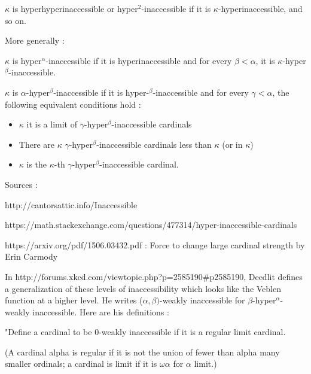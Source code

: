 \documentclass[10pt]{article}
\begin{document}
\(\kappa\) is hyperhyperinaccessible or hyper\(^2\)-inaccessible if it is \(\kappa\)-hyperinaccessible, and so on.

More generally :

\(\kappa\) is hyper\(^\alpha\)-inaccessible if it is hyperinaccessible and for every \( \beta < \alpha \), it is \(\kappa\)-hyper\(^\beta\)-inaccessible.

\(\kappa\) is \(\alpha\)-hyper\(^\beta\)-inaccessible if it is hyper-\(^\beta\)-inaccessible and for every \( \gamma < \alpha \), the following equivalent conditions hold :

\begin{itemize}
     \setlength{\itemsep}{1pt}
     \setlength{\parskip}{0pt}
     \setlength{\parsep}{0pt}

\item \(\kappa\)  it is a limit of \(\gamma\)-hyper\(^\beta\)-inaccessible cardinals

\item There are \(\kappa\) \(\gamma\)-hyper\(^\beta\)-inaccessible cardinals less than \(\kappa\) (or in \(\kappa\))

\item \(\kappa\) is the \(\kappa\)-th \(\gamma\)-hyper\(^\beta\)-inaccessible cardinal.

\end{itemize}

Sources : 

http://cantorsattic.info/Inaccessible

https://math.stackexchange.com/questions/477314/hyper-inaccessible-cardinals

https://arxiv.org/pdf/1506.03432.pdf : Force to change large cardinal strength by Erin Carmody


\bigskip

In http://forums.xkcd.com/viewtopic.php?p=2585190\#p2585190, Deedlit defines a generalization of these levels of inaccessibility which looks like the Veblen function at a higher level. He writes (\(\alpha,\beta)\)-weakly inaccessible for \(\beta\)-hyper\(^\alpha\)-weakly inaccessible. Here are his definitions :

\bigskip

"Define a cardinal to be 0-weakly inaccessible if it is a regular limit cardinal.

(A cardinal alpha is regular if it is not the union of fewer than alpha many smaller ordinals;
a cardinal is limit if it is \(\omega\)\(\alpha\) for \(\alpha\) limit.)
\end{document}
